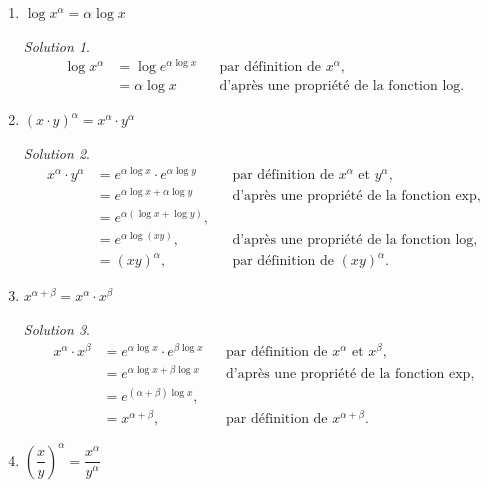 \documentclass[
  12pt,
  letterpaper,
]{book}
\theoremstyle{remark}
\newtheorem*{solution}{Solution}
\begin{document}
\begin{enumerate}
\item
  \(\log x^\alpha = \alpha\log x\)

  \begin{solution}

  \begin{align}
  \log x^\alpha &=\log e^{\alpha\log x} && \text{par définition de $x^{\alpha}$,} \\
  &=\alpha\log x && \text{d'après une propriété de la fonction $\log$.}
  \end{align}

  \end{solution}
\item
  \((x\cdot y)^\alpha=x^{\alpha}\cdot y^{\alpha}\)

  \begin{solution}

  \begin{align}
  x^{\alpha}\cdot y^{\alpha} &=e^{\alpha\log x}\cdot e^{\alpha\log y} && \text{par définition de $x^{\alpha}$ et $y^{\alpha}$,} \\
  &=e^{\alpha\log x+\alpha\log y} && \text{d'après une propriété de la fonction $\exp$,} \\
  &=e^{\alpha(\log x+\log y)}, && \\
  &=e^{\alpha\log(xy)}, && \text{d'après une propriété de la fonction $\log$,} \\
  &=(xy)^{\alpha}, && \text{par définition de $(xy)^{\alpha}$.}
  \end{align}

  \end{solution}
\item
  \(x^{\alpha+\beta}=x^{\alpha}\cdot x^{\beta}\)

  \begin{solution}

  \begin{align}
  x^{\alpha}\cdot x^{\beta} &=e^{\alpha\log x}\cdot e^{\beta\log x} && \text{par définition de $x^{\alpha}$ et $x^{\beta}$,} \\
  &=e^{\alpha\log x+\beta\log x} && \text{d'après une propriété de la fonction $\exp$,} \\
  &=e^{(\alpha+\beta)\log x}, && \\
  &=x^{\alpha+\beta}, && \text{par définition de $x^{\alpha+\beta}$.}
  \end{align}

  \end{solution}
\item
  \(\left(\dfrac{x}{y}\right)^{\alpha}=\dfrac{x^{\alpha}}{y^{\alpha}}\)


\end{enumerate}
\end{document}
